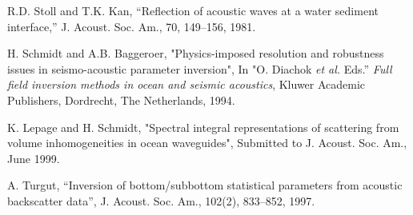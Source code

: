 \begin{thebibliography}{1}
R.D. Stoll and T.K. Kan, ``Reflection of acoustic waves at a water
sediment interface,'' J. Acoust. Soc. Am., 70, 149--156, 1981.

H. Schmidt and A.B. Baggeroer, "Physics-imposed resolution and robustness 
        issues in seismo-acoustic parameter inversion", 
        In "O. Diachok {\em et al.} Eds.'' {\em Full field inversion methods 
                in ocean and seismic
		acoustics}, Kluwer Academic Publishers,
	        Dordrecht, The Netherlands, 1994.


K. Lepage and H. Schmidt,
        "Spectral integral representations of scattering from
                  volume inhomogeneities in ocean waveguides", 
Submitted to J. Acoust. Soc. Am., June 1999.

A. Turgut, ``Inversion of bottom/subbottom statistical parameters from acoustic backscatter data'', J. Acoust. Soc. Am., 102(2), 833--852, 1997.
  
\end{thebibliography}



